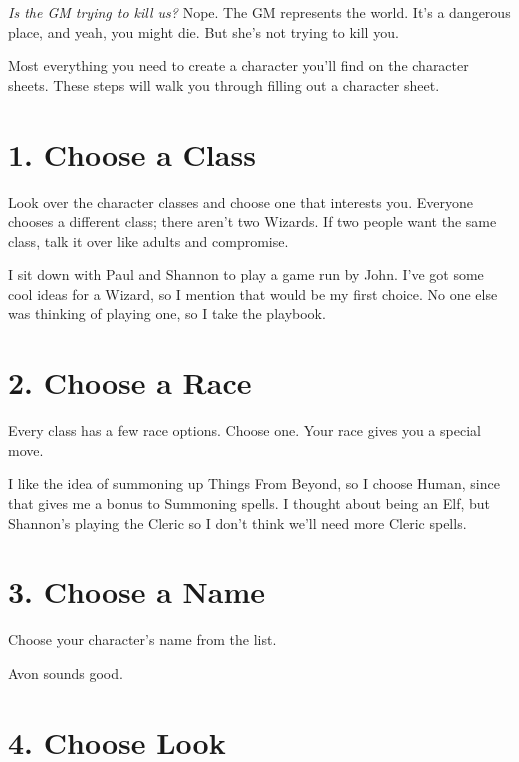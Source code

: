        

         {\em Is the GM trying to kill us?}  Nope. The GM represents the world. It's a dangerous place, and yeah, you might die. But she's not trying to kill you.

       

Most everything you need to create a character you'll find on the character sheets. These steps will walk you through filling out a character sheet.

       
\section{1. Choose a Class}     
       

Look over the character classes and choose one that interests you. Everyone chooses a different class; there aren't two Wizards. If two people want the same class, talk it over like adults and compromise.

       
\startExample
I sit down with Paul and Shannon to play a game run by John. I've got some cool ideas for a Wizard, so I mention that would be my first choice. No one else was thinking of playing one, so I take the playbook.
\stopExample
       
\section{2. Choose a Race}     
       

Every class has a few race options. Choose one. Your race gives you a special move.

       
\startExample
I like the idea of summoning up Things From Beyond, so I choose Human, since that gives me a bonus to Summoning spells. I thought about being an Elf, but Shannon's playing the Cleric so I don't think we'll need more Cleric spells.
\stopExample
       
\section{3. Choose a Name}    
       

Choose your character’s name from the list.

       
\startExample
Avon sounds good.
\stopExample
       
\section{4. Choose Look}    
       

